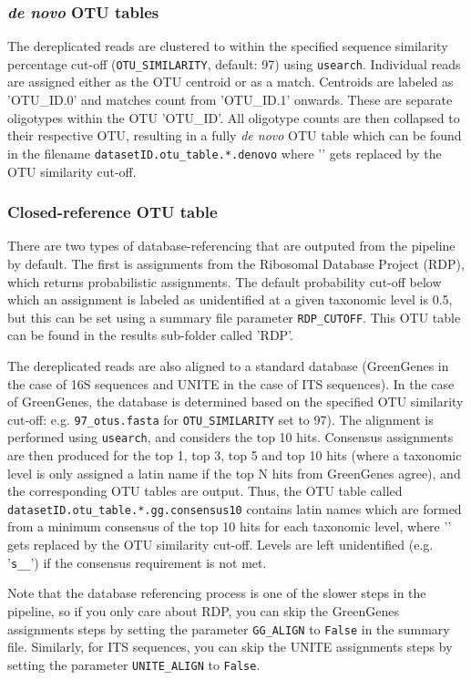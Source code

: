 \documentclass[11pt, oneside]{article}   	%
\begin{document}
\subsubsection{\textit{de novo} OTU tables}
The dereplicated reads are clustered to within the specified sequence similarity percentage cut-off ({\tt OTU\_SIMILARITY}, default: 97) using {\tt usearch}.  Individual reads are assigned either as the OTU centroid or as a match. Centroids are labeled as 'OTU\_ID.0' and matches count from 'OTU\_ID.1' onwards.  These are separate oligotypes within the OTU 'OTU\_ID'. All oligotype counts are then collapsed to their respective OTU, resulting in a fully \textit{de novo} OTU table which can be found in the filename {\tt datasetID.otu\_table.*.denovo} where '{\tt *}' gets replaced by the OTU similarity cut-off.

\subsubsection{Closed-reference OTU table}
There are two types of database-referencing that are outputed from the pipeline by default.  The first is assignments from the Ribosomal Database Project (RDP), which returns probabilistic assignments.  The default probability cut-off below which an assignment is labeled as unidentified at a given taxonomic level is 0.5, but this can be set using a summary file parameter {\tt RDP\_CUTOFF}.  This OTU table can be found in the results sub-folder called 'RDP'.

The dereplicated reads are also aligned to a standard database (GreenGenes in the case of 16S sequences and UNITE in the case of ITS sequences).  In the case of GreenGenes, the database is determined based on the specified OTU similarity cut-off: e.g. {\tt 97\_otus.fasta} for {\tt OTU\_SIMILARITY} set to 97).  The alignment is performed using {\tt usearch}, and considers the top 10 hits.  Consensus assignments are then produced for the top 1, top 3, top 5 and top 10 hits (where a taxonomic level is only assigned a latin name if the top N hits from GreenGenes agree), and the corresponding OTU tables are output.  Thus, the OTU table called {\tt datasetID.otu\_table.*.gg.consensus10} contains latin names which are formed from a minimum consensus of the top 10 hits for each taxonomic level, where '{\tt *}' gets replaced by the OTU similarity cut-off.  Levels are left unidentified (e.g. '{\tt s\_\_}') if the consensus requirement is not met.  

Note that the database referencing process is one of the slower steps in the pipeline, so if you only care about RDP, you can skip the GreenGenes assignments steps by setting the parameter {\tt GG\_ALIGN} to {\tt False} in the summary file.  Similarly, for ITS sequences, you can skip the UNITE assignments steps by setting the parameter {\tt UNITE\_ALIGN} to {\tt False}.
\end{document}
